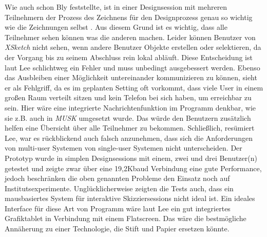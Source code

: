 Wie auch schon Bly feststellte, ist in einer Designsession mit mehreren Teilnehmern der Prozess des Zeichnens für den Designprozess genau so wichtig wie die Zeichnungen selbst \citep{Bly:1988:UDS:62266.62286}. Aus diesem Grund ist es wichtig, dass alle Teilnehmer sehen können was die anderen machen. Leider können Benutzer von \emph{XSketch} nicht sehen, wenn andere Benutzer Objekte erstellen oder selektieren, da der Vorgang bis zu seinem Abschluss rein lokal abläuft. Diese Entscheidung ist laut Lee schlichtweg ein Fehler und muss unbedingt ausgebessert werden. Ebenso das Ausbleiben einer Möglichkeit untereinander kommunizieren zu können, sieht er als Fehlgriff, da es im geplanten Setting oft vorkommt, dass viele User in einem großen Raum verteilt sitzen und kein Telefon bei sich haben, um erreichbar zu sein. Hier wäre eine integrierte Nachrichtenfunktion im Programm denkbar, wie sie z.B. auch in \emph{MUSK} \citep{Crampton:1987} umgesetzt wurde. Das würde den Benutzern zusätzlich helfen eine Übersicht über alle Teilnehmer zu bekommen. 
Schließlich, resümiert Lee, war es rückblickend auch falsch anzunehmen, dass sich die Anforderungen von multi-user Systemen von single-user Systemen nicht unterscheiden. Der Prototyp wurde in simplen Designsessions mit einem, zwei und drei Benutzer(n) getestet und zeigte zwar über eine 19,2Kbaud Verbindung eine gute Performance, jedoch beschränken die oben genannten Probleme den Einsatz noch auf Institutsexperimente.
Unglücklicherweise zeigten die Tests auch, dass ein mausbasiertes System für interaktive Skizziersessions nicht ideal ist. Ein ideales Interface für diese Art von Programm wäre laut Lee ein gut integriertes Grafiktablet in Verbindung mit einem Flatscreen. Das wäre die bestmögliche Annäherung zu einer Technologie, die Stift und Papier ersetzen könnte.
\clearpage


